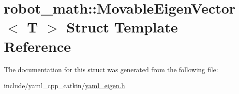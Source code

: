 \hypertarget{structrobot__math_1_1MovableEigenVector}{}\section{robot\+\_\+math\+:\+:Movable\+Eigen\+Vector$<$ T $>$ Struct Template Reference}
\label{structrobot__math_1_1MovableEigenVector}


The documentation for this struct was generated from the following file\+:\begin{DoxyCompactItemize}
\item 
include/yaml\+\_\+cpp\+\_\+catkin/\hyperlink{yaml__eigen_8h}{yaml\+\_\+eigen.\+h}\end{DoxyCompactItemize}
